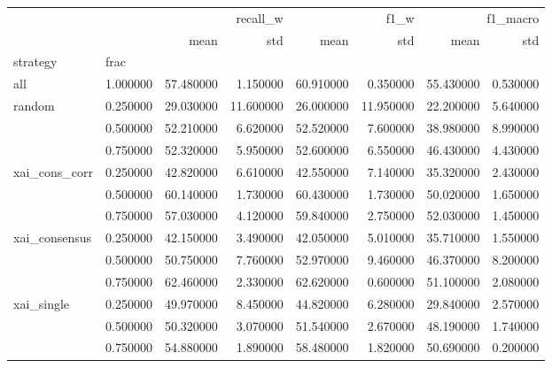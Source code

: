 \begin{tabular}{llrrrrrr}
\toprule
 &  & \multicolumn{2}{r}{recall_w} & \multicolumn{2}{r}{f1_w} & \multicolumn{2}{r}{f1_macro} \\
 &  & mean & std & mean & std & mean & std \\
strategy & frac &  &  &  &  &  &  \\
\midrule
all & 1.000000 & 57.480000 & 1.150000 & 60.910000 & 0.350000 & 55.430000 & 0.530000 \\
\cline{1-8}
\multirow[t]{3}{*}{random} & 0.250000 & 29.030000 & 11.600000 & 26.000000 & 11.950000 & 22.200000 & 5.640000 \\
 & 0.500000 & 52.210000 & 6.620000 & 52.520000 & 7.600000 & 38.980000 & 8.990000 \\
 & 0.750000 & 52.320000 & 5.950000 & 52.600000 & 6.550000 & 46.430000 & 4.430000 \\
\cline{1-8}
\multirow[t]{3}{*}{xai_cons_corr} & 0.250000 & 42.820000 & 6.610000 & 42.550000 & 7.140000 & 35.320000 & 2.430000 \\
 & 0.500000 & 60.140000 & 1.730000 & 60.430000 & 1.730000 & 50.020000 & 1.650000 \\
 & 0.750000 & 57.030000 & 4.120000 & 59.840000 & 2.750000 & 52.030000 & 1.450000 \\
\cline{1-8}
\multirow[t]{3}{*}{xai_consensus} & 0.250000 & 42.150000 & 3.490000 & 42.050000 & 5.010000 & 35.710000 & 1.550000 \\
 & 0.500000 & 50.750000 & 7.760000 & 52.970000 & 9.460000 & 46.370000 & 8.200000 \\
 & 0.750000 & 62.460000 & 2.330000 & 62.620000 & 0.600000 & 51.100000 & 2.080000 \\
\cline{1-8}
\multirow[t]{3}{*}{xai_single} & 0.250000 & 49.970000 & 8.450000 & 44.820000 & 6.280000 & 29.840000 & 2.570000 \\
 & 0.500000 & 50.320000 & 3.070000 & 51.540000 & 2.670000 & 48.190000 & 1.740000 \\
 & 0.750000 & 54.880000 & 1.890000 & 58.480000 & 1.820000 & 50.690000 & 0.200000 \\
\cline{1-8}
\bottomrule
\end{tabular}
